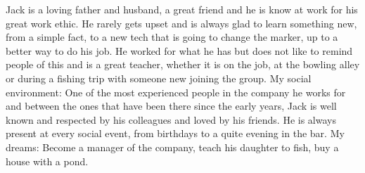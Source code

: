 \newline
Jack is a loving father and husband, a great friend and he is know at work for his great work ethic. He rarely gets upset and is always glad to learn something new, from a simple fact, to a new tech that is going to change the marker, up to a better way to do his job. He worked for what he has but does not like to remind people of this and is a great teacher, whether it is on the job, at the bowling alley or during a fishing trip with someone new joining the group. 
\newline
My social environment: 
\newline
One of the most experienced people in the company he works for and between the ones that have been there since the early years, Jack is well known and respected by his colleagues and loved by his friends. He is always present at every social event, from birthdays to a quite evening in the bar. 
\newline
My dreams: 
\newline
Become a manager of the company, teach his daughter to fish, buy a house with a pond.